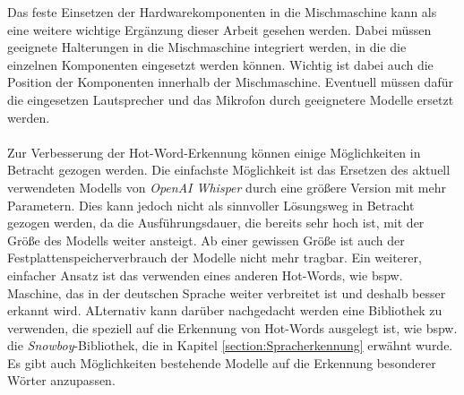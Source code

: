 Das feste Einsetzen der Hardwarekomponenten in die Mischmaschine kann als eine weitere wichtige Ergänzung dieser Arbeit gesehen werden. Dabei müssen geeignete Halterungen in die Mischmaschine integriert werden, in die die einzelnen Komponenten eingesetzt werden können. Wichtig ist dabei auch die Position der Komponenten innerhalb der Mischmaschine. Eventuell müssen dafür die eingesetzen Lautsprecher und das Mikrofon durch geeignetere Modelle ersetzt werden.\\\\
Zur Verbesserung der Hot-Word-Erkennung können einige Möglichkeiten in Betracht gezogen werden. Die einfachste Möglichkeit ist das Ersetzen des aktuell verwendeten Modells von \textit{OpenAI Whisper} durch eine größere Version mit mehr Parametern. Dies kann jedoch nicht als sinnvoller Lösungsweg in Betracht gezogen werden, da die Ausführungsdauer, die bereits sehr hoch ist, mit der Größe des Modells weiter ansteigt. Ab einer gewissen Größe ist auch der Festplattenspeicherverbrauch der Modelle nicht mehr tragbar. Ein weiterer, einfacher Ansatz ist das verwenden eines anderen Hot-Words, wie bspw. \glqq{}Maschine\grqq{}, das in der deutschen Sprache weiter verbreitet ist und deshalb besser erkannt wird. ALternativ kann darüber nachgedacht werden eine Bibliothek zu verwenden, die speziell auf die Erkennung von Hot-Words ausgelegt ist, wie bspw. die \textit{Snowboy}-Bibliothek, die in Kapitel \ref{section:Spracherkennung} erwähnt wurde. Es gibt auch Möglichkeiten bestehende Modelle auf die Erkennung besonderer Wörter anzupassen.



